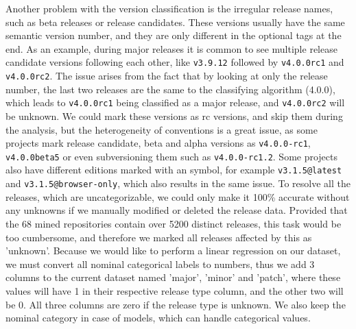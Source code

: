 Another problem with the version classification is the irregular release names, such as beta releases or release candidates. These versions usually have the same semantic version number, and they are only different in the optional tags at the end. As an example, during major releases it is common to see multiple release candidate versions following each other, like \texttt{v3.9.12} followed by \texttt{v4.0.0rc1} and \texttt{v4.0.0rc2}. The issue arises from the fact that by looking at only the release number, the last two releases are the same to the classifying algorithm (4.0.0), which leads to \texttt{v4.0.0rc1} being classified as a major release, and \texttt{v4.0.0rc2} will be unknown. We could mark these versions as rc versions, and skip them during the analysis, but the heterogeneity of conventions is a great issue, as some projects mark release candidate, beta and alpha versions as \texttt{v4.0.0-rc1}, \texttt{v4.0.0beta5} or even subversioning them such as \texttt{v4.0.0-rc1.2}. Some projects also have different editions marked with an \@ symbol, for example \texttt{v3.1.5@latest} and \texttt{v3.1.5@browser-only}, which also results in the same issue. To resolve all the releases, which are uncategorizable, we could only make it 100\% accurate without any unknowns if we manually modified or deleted the release data. Provided that the 68 mined repositories contain over 5200 distinct releases, this task would be too cumbersome, and therefore we marked all releases affected by this as 'unknown'. Because we would like to perform a linear regression on our dataset, we must convert all nominal categorical labels to numbers, thus we add 3 columns to the current dataset named 'major', 'minor' and 'patch', where these values will have 1 in their respective release type column, and the other two will be 0. All three columns are zero if the release type is unknown. We also keep the nominal category in case of models, which can handle categorical values.

